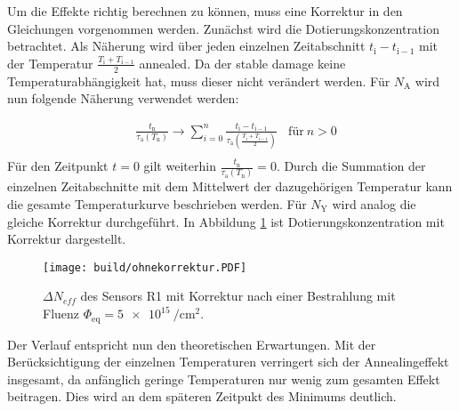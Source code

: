 Um die Effekte richtig berechnen zu können, muss eine Korrektur in den
Gleichungen vorgenommen werden.
Zunächst wird die Dotierungskonzentration betrachtet. Als Näherung wird über
jeden einzelnen Zeitabschnitt $t_{\mathrm{i}} - t_{\mathrm{i-1}}$ mit der
Temperatur $\frac{T_{\mathrm{i}} +T_{\mathrm{i-1}}}{2}$ annealed.
Da der stable damage keine Temperaturabhängigkeit hat, muss dieser nicht
verändert werden. Für $N_{\mathrm{A}}$ wird nun folgende Näherung
verwendet werden:

\begin{align}
  &\frac{t_{\mathrm{n}}}{\tau_{\mathrm{a}}(T_{\mathrm{n}})} \rightarrow \sum_{i=0}^n  \frac{t_{\mathrm{i}} - t_{\mathrm{i-1}}}{\tau_{\mathrm{a}}(\frac{T_{\mathrm{i}} +T_{\mathrm{i-1}}}{2})} \:\:\:\: \text{für} \: n>0 \\
\end{align}
Für den Zeitpunkt $t=0$ gilt weiterhin $\frac{t_{\mathrm{n}}}{\tau_{\mathrm{a}}(T_{\mathrm{n}})} = 0$.
Durch die Summation der einzelnen Zeitabschnitte mit dem Mittelwert der dazugehörigen
Temperatur kann die gesamte Temperaturkurve beschrieben werden. Für $N_{\mathrm{Y}}$
wird analog die gleiche Korrektur durchgeführt.
In Abbildung \ref{fig:korrektur_N_eff} ist Dotierungskonzentration mit Korrektur dargestellt.


\begin{figure}
    \texttt{[image: build/ohnekorrektur.PDF]}
\caption{$\Delta N_{eff}$ des Sensors R1 mit Korrektur nach einer Bestrahlung mit Fluenz $\Phi_{\mathrm{eq}} = \SI{5e15}{\per\centi\meter\squared}.$}
\label{fig:korrektur_N_eff}
\end{figure}


Der Verlauf entspricht nun den theoretischen Erwartungen. Mit der Berücksichtigung
der einzelnen Temperaturen verringert sich der Annealingeffekt insgesamt, da anfänglich
geringe Temperaturen nur wenig zum gesamten Effekt beitragen. Dies wird
an dem späteren Zeitpukt des Minimums deutlich.

